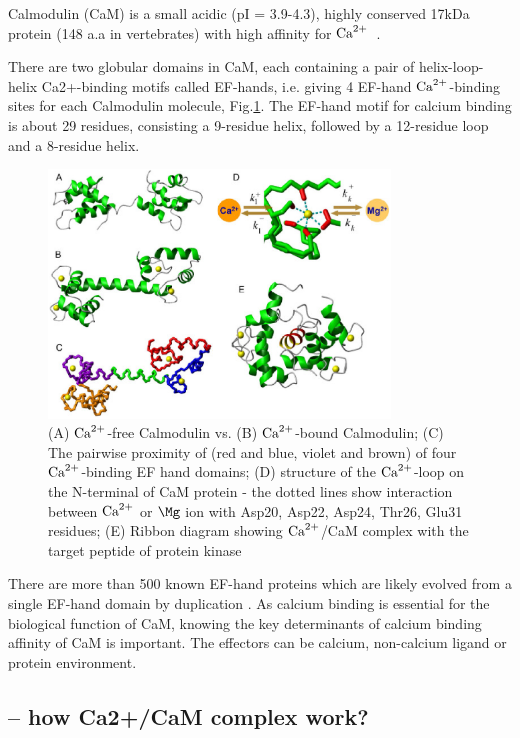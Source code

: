 Calmodulin (CaM) is a small acidic (pI = 3.9-4.3), highly conserved 17kDa
protein (148 a.a in vertebrates) with high affinity for ${\text{Ca}^{2+}}$~\citep{Chin2000a}.

There are two globular domains in CaM, each containing a pair of
helix-loop-helix Ca2+-binding motifs called EF-hands, i.e. giving 4 EF-hand
${\text{Ca}^{2+}}$-binding sites for each Calmodulin molecule,
Fig.\ref{fig:Calmodulin-4-EF-hands}. The EF-hand motif for calcium binding is
about 29 residues, consisting a 9-residue helix, followed by a 12-residue loop
and a 8-residue helix.

\begin{figure}[hbt]
  \centerline{\includegraphics[height=6.6cm,
    angle=0]{./images/Calmodulin-4-EF-hands.eps}}
\caption{(A) ${\text{Ca}^{2+}}$-free Calmodulin vs. (B) ${\text{Ca}^{2+}}$-bound Calmodulin; (C) The
pairwise proximity of (red and blue, violet and brown) of four ${\text{Ca}^{2+}}$-binding EF
hand domains; (D) structure of the ${\text{Ca}^{2+}}$-loop on the N-terminal of CaM protein
- the dotted lines show interaction between ${\text{Ca}^{2+}}$ or $\Mg$ ion with Asp20,
Asp22, Asp24, Thr26, Glu31 residues; (E) Ribbon diagram showing ${\text{Ca}^{2+}}$/CaM
complex with the target peptide of protein kinase \citep{valeyev2008} }
\label{fig:Calmodulin-4-EF-hands}
\end{figure}


There are more than 500 known EF-hand proteins which are likely evolved from a
single EF-hand domain by duplication \citep{yang2003}. As calcium binding is
essential for the biological function of CaM, knowing the key determinants of
calcium binding affinity of CaM is important. The effectors can be calcium,
non-calcium ligand or protein environment. 

\subsection{-- how Ca2+/CaM complex work?}


